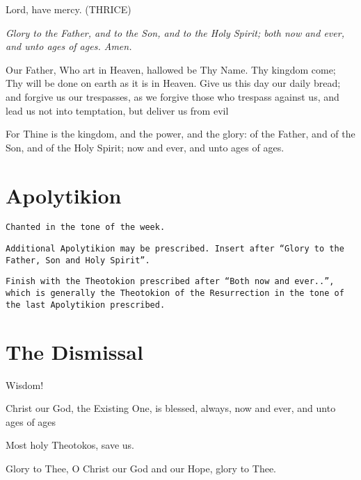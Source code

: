 \documentclass[twoside, letterpaper, 12pt]{report}
\newcommand{\instruction}[1]{%
  \texttt{\scriptsize{#1}}%
}
\newcommand{\centeredsection}[1]{%
  \needspace{10\baselineskip}%
  \section*{\centering{}#1}%
}
\begin{document}
\vbox{}
Lord, have mercy. (THRICE)

\vbox{}
\emph{Glory to the Father, and to the Son, and to the Holy Spirit; both now and ever, and
unto ages of ages. Amen.}

\vbox{}
Our Father, Who art in Heaven, hallowed be Thy Name. Thy kingdom come; Thy
will be done on earth as it is in Heaven. Give us this day our daily bread; and forgive
us our trespasses, as we forgive those who trespass against us, and lead us not into
temptation, but deliver us from evil

\begin{priest}
\item For Thine is the kingdom, and the power, and the glory:
    of the Father, and of the Son, and of the Holy Spirit; now and ever, and unto ages of ages.
\end{priest}


\centeredsection{Apolytikion}
\instruction{Chanted in the tone of the week.}

\vbox{}
\instruction{Additional Apolytikion may be prescribed. Insert after
``Glory to the Father, Son and Holy Spirit''.}

\vbox{}
\instruction{Finish with the Theotokion prescribed after ``Both now and ever..'',
which is generally the Theotokion of the Resurrection in the tone of the last Apolytikion prescribed.
}
\cleardoublepage

\centeredsection{The Dismissal}

\begin{deacon}
\item Wisdom!
\end{deacon}

\begin{priest}
\item Christ our God, the Existing One, is blessed, always, now and ever,
    and unto ages of ages
\end{priest}

\begin{priest}
\item Most holy Theotokos, save us.
\end{priest}

\begin{priest}
\item Glory to Thee, O Christ our God and our Hope, glory to Thee.
\end{priest}
\end{document}
